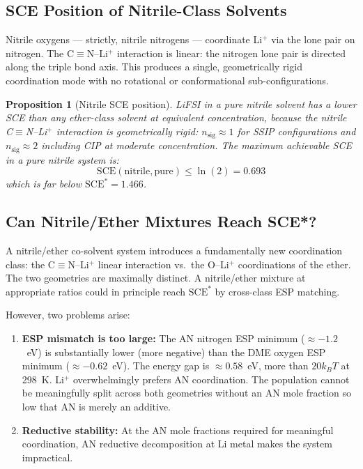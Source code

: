 \documentclass[11pt]{article}
\theoremstyle{plain}
\newtheorem{proposition}[theorem]{Proposition}
\theoremstyle{definition}
\theoremstyle{remark}
\begin{document}
\subsection{SCE Position of Nitrile-Class Solvents}

Nitrile oxygens --- strictly, nitrile nitrogens --- coordinate
Li$^+$ via the lone pair on nitrogen.  The C$\equiv$N--Li$^+$
interaction is linear: the nitrogen lone pair is directed along
the triple bond axis.  This produces a single, geometrically
rigid coordination mode with no rotational or conformational
sub-configurations.

\begin{proposition}[Nitrile SCE position]
LiFSI in a pure nitrile solvent has a lower SCE than any
ether-class solvent at equivalent concentration, because the
nitrile C$\equiv$N--Li$^+$ interaction is geometrically rigid:
$n_\mathrm{sig} \approx 1$ for SSIP configurations and
$n_\mathrm{sig} \approx 2$ including CIP at moderate concentration.
The maximum achievable SCE in a pure nitrile system is:
\begin{equation}
  \mathrm{SCE}(\mathrm{nitrile}, \mathrm{pure}) \leq \ln(2) = 0.693
\end{equation}
which is far below $\mathrm{SCE}^{*} = 1.466$.
\end{proposition}

\subsection{Can Nitrile/Ether Mixtures Reach SCE*?}

A nitrile/ether co-solvent system introduces a fundamentally
new coordination class: the C$\equiv$N--Li$^+$ linear
interaction vs.\ the O--Li$^+$ coordinations of the ether.
The two geometries are maximally distinct.  A nitrile/ether
mixture at appropriate ratios could in principle reach
$\mathrm{SCE}^{*}$ by cross-class ESP matching.

However, two problems arise:

\begin{enumerate}[leftmargin=2em]
  \item \textbf{ESP mismatch is too large:} The AN nitrogen
        ESP minimum ($\approx -1.2$~eV) is substantially
        lower (more negative) than the DME oxygen ESP minimum
        ($\approx -0.62$~eV).  The energy gap is $\approx 0.58$~eV,
        more than $20 k_BT$ at 298~K.  Li$^+$ overwhelmingly
        prefers AN coordination.  The population cannot be
        meaningfully split across both geometries without
        an AN mole fraction so low that AN is merely an additive.
  \item \textbf{Reductive stability:} At the AN mole fractions
        required for meaningful coordination, AN reductive
        decomposition at Li metal makes the system impractical.
\end{enumerate}
\end{document}
